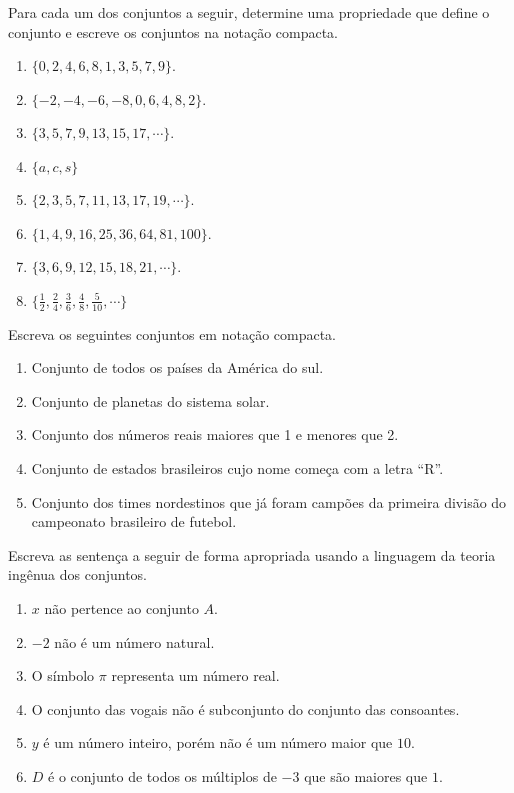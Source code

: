 \begin{problemset}
	\item Para cada um dos conjuntos a seguir, determine uma propriedade que define o conjunto e escreve os conjuntos na notação compacta.
	\begin{enumerate}
		\item $\{0,2,4,6,8,1,3,5,7,9\}$.
		\item $\{-2, -4, -6, -8, 0, 6, 4, 8, 2\}$.
		\item $\{3, 5, 7, 9, 13, 15, 17, \cdots\}$.
		\item $\{a, c, s\}$
		\item $\{2, 3, 5, 7, 11, 13, 17, 19, \cdots\}$.
		\item $\{1, 4, 9, 16, 25, 36, 64, 81, 100\}$.
		\item $\{3, 6, 9, 12, 15, 18, 21, \cdots\}$.
		\item $\{\frac{1}{2}, \frac{2}{4}, \frac{3}{6}, \frac{4}{8}, \frac{5}{10}, \cdots\}$
	\end{enumerate}
	\item Escreva os seguintes conjuntos em notação compacta.
	\begin{enumerate}
		\item Conjunto de todos os países da América do sul.
		\item Conjunto de planetas do sistema solar.
		\item Conjunto dos números reais maiores que 1 e menores que 2.
		\item Conjunto de estados brasileiros cujo nome começa com a letra ``R''.
		\item Conjunto dos times nordestinos que já foram campões da primeira divisão do campeonato brasileiro de futebol.
	\end{enumerate}
	\item Escreva as sentença a seguir de forma apropriada usando a linguagem da teoria ingênua dos conjuntos.
	\begin{enumerate}
		\item $x$ não pertence ao conjunto $A$.
		\item $-2$ não é um número natural.
		\item O símbolo $\pi$ representa um número real.
		\item O conjunto das vogais não é subconjunto do conjunto das consoantes. 
		\item $y$ é um número inteiro, porém não é um número maior que $10$.
		\item $D$ é o conjunto de todos os múltiplos de $-3$ que são maiores que $1$.

\end{enumerate}
\end{problemset}
